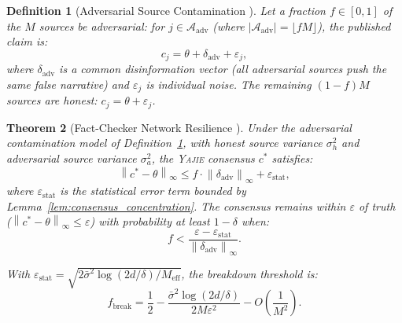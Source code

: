 \documentclass[11pt,a4paper]{article}
\newtheorem{theorem}{Theorem}[section]
\newtheorem{definition}[theorem]{Definition}
\theoremstyle{definition}
\newcommand{\Yajie}{\textsc{Yajie}}
\newcommand{\norm}[1]{\left\lVert#1\right\rVert}
\newcommand{\cA}{\mathcal{A}}
\begin{document}
\begin{definition}[Adversarial Source Contamination ]
\label{def:adversarial}
Let a fraction $f \in [0, 1]$ of the $M$ sources be adversarial: for $j \in \cA_{\mathrm{adv}}$ (where $|\cA_{\mathrm{adv}}| = \lfloor fM \rfloor$), the published claim is:
\begin{equation}
    c_j = \theta + \delta_{\mathrm{adv}} + \varepsilon_j,
    \label{eq:adversarial_claim}
\end{equation}
where $\delta_{\mathrm{adv}}$ is a common disinformation vector (all adversarial sources push the same false narrative) and $\varepsilon_j$ is individual noise. The remaining $(1-f)M$ sources are honest: $c_j = \theta + \varepsilon_j$.
\end{definition}

\begin{theorem}[Fact-Checker Network Resilience ]
\label{thm:resilience}
Under the adversarial contamination model of Definition~\ref{def:adversarial}, with honest source variance $\sigma_h^2$ and adversarial source variance $\sigma_a^2$, the \Yajie{} consensus $c^*$ satisfies:
\begin{equation}
    \norm{c^* - \theta}_\infty \leq f \cdot \norm{\delta_{\mathrm{adv}}}_\infty + \varepsilon_{\mathrm{stat}},
    \label{eq:resilience_bound}
\end{equation}
where $\varepsilon_{\mathrm{stat}}$ is the statistical error term bounded by Lemma~\ref{lem:consensus_concentration}. The consensus remains within $\varepsilon$ of truth ($\norm{c^* - \theta}_\infty \leq \varepsilon$) with probability at least $1 - \delta$ when:
\begin{equation}
    f < \frac{\varepsilon - \varepsilon_{\mathrm{stat}}}{\norm{\delta_{\mathrm{adv}}}_\infty}.
    \label{eq:f_threshold}
\end{equation}

With $\varepsilon_{\mathrm{stat}} = \sqrt{2\bar{\sigma}^2 \log(2d/\delta) / M_{\mathrm{eff}}}$, the breakdown threshold is:
\begin{equation}
    f_{\mathrm{break}} = \frac{1}{2} - \frac{\bar{\sigma}^2 \log(2d/\delta)}{2M\varepsilon^2} - O\left(\frac{1}{M^2}\right).
    \label{eq:breakdown_threshold}
\end{equation}
\end{theorem}
\end{document}
